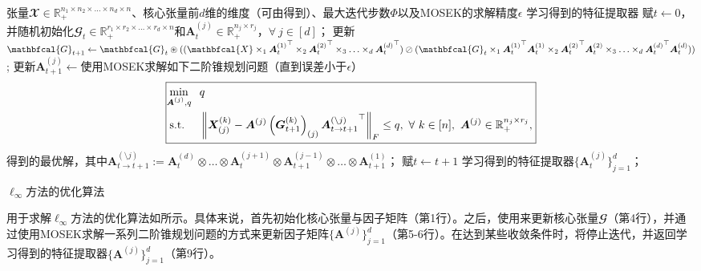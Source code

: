 \begin{algorithm}[t]
	\begin{algorithmic}[1]
	\REQUIRE 张量$\mathbfcal{X} \in \mathbb{R}_{+}^{n_1 \times n_2 \times \ldots \times n_d \times n}$、核心张量前$d$维的维度（可由得到）、最大迭代步数$\Phi$以及MOSEK的求解精度$\epsilon$
	\ENSURE 学习得到的特征提取器
	\STATE 赋$t\leftarrow 0$，并随机初始化$\mathbfcal{G}_{t} \in \mathbb{R}_{+}^{r_1 \times r_2 \times \ldots \times r_d \times n}$和$\boldsymbol{A}^{(j)}_{t}\in \mathbb{R}_{+}^{n_j \times r_j}$，$\forall~ j\in[d]$；\hspace{-2em}
    \STATE 更新$\mathbfcal{G}_{t+1} \leftarrow \mathbfcal{G}_{t} \oast ((\mathbfcal{X} \times_{1} {\boldsymbol{A}_{t}^{(1)}}^{\top} \times_{2} {\boldsymbol{A}_{t}^{(2)}}^{\top} \times_{3} \ldots \times_{d} {\boldsymbol{A}_{t}^{(d)}}^{\top})\oslash
	(\mathbfcal{G}_{t} \times_{1} {\boldsymbol{A}_{t}^{(1)}}^{\top} \boldsymbol{A}_{t}^{(1)} \times_{2} {\boldsymbol{A}_{t}^{(2)}}^{\top} \boldsymbol{A}_{t}^{(2)} \times_{3}  \ldots \times_{d} {\boldsymbol{A}_{t}^{(d)}}^{\top} \boldsymbol{A}_{t}^{(d)}))$;
    \STATE 更新$\boldsymbol{A}_{t+1}^{(j)}\leftarrow$使用MOSEK求解如下二阶锥规划问题（直到误差小于$\epsilon$）
    \begin{equation*}
    \boxed{
        \begin{aligned}
        &\underset{\mathclap{\boldsymbol{A}^{(j)},q}}{\min} && q \\
        &\text{s.t.} && \left\|\boldsymbol{X}^{(k)}_{(j)}- \boldsymbol{A}^{(j)} \left(\boldsymbol{G}_{t+1}^{(k)}\right)_{(j)} {\boldsymbol{A}_{t\rightarrow t+1}^{(\setminus j)}}^{\top}\right\|_{F} \leq q,~\forall~ k\in[n],~\boldsymbol{A}^{(j)} \in \mathbb{R}_{+}^{n_j \times r_j},
        \end{aligned}
    }
    \end{equation*}
    得到的最优解，其中$\boldsymbol{A}_{t\rightarrow t+1}^{(\setminus j)} := \boldsymbol{A}_{t}^{(d)} \otimes \ldots \otimes \boldsymbol{A}_{t}^{(j+1)} \otimes \boldsymbol{A}_{t+1}^{(j-1)} \otimes \ldots \otimes \boldsymbol{A}_{t+1}^{(1)}$；
    \ENDFOR
    \STATE 赋$t\leftarrow t+1$
    \ENDWHILE
	\RETURN 学习得到的特征提取器$\{\boldsymbol{A}_{t}^{(j)}\}_{j=1}^{d}$；
	\end{algorithmic}
	\captionsetup{labelsep=period,font=bf}
	\caption{$\ell_\infty$方法的优化算法}
	\label{alg:l-infty}
\end{algorithm}

用于求解$\ell_\infty$方法的优化算法如所示。具体来说，首先初始化核心张量与因子矩阵（第1行）。之后，使用来更新核心张量$\mathbfcal{G}$（第4行），并通过使用MOSEK求解一系列二阶锥规划问题的方式来更新因子矩阵$\{\boldsymbol{A}^{(j)}\}_{j=1}^{d}$（第5-6行）。在达到某些收敛条件时，将停止迭代，并返回学习得到的特征提取器$\{\boldsymbol{A}^{(j)}\}_{j=1}^{d}$（第9行）。

